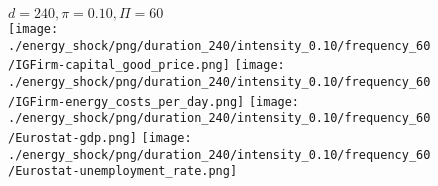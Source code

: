 \begin{figure}[ht!]
\centering\leavevmode
\begin{minipage}{17cm}
\centering\leavevmode
{$d=240, \pi=0.10, \Pi=60$}\\
\texttt{[image: ./energy\_shock/png/duration\_240/intensity\_0.10/frequency\_60/IGFirm-capital\_good\_price.png]}
\texttt{[image: ./energy\_shock/png/duration\_240/intensity\_0.10/frequency\_60/IGFirm-energy\_costs\_per\_day.png]}
\texttt{[image: ./energy\_shock/png/duration\_240/intensity\_0.10/frequency\_60/Eurostat-gdp.png]}
\texttt{[image: ./energy\_shock/png/duration\_240/intensity\_0.10/frequency\_60/Eurostat-unemployment\_rate.png]}
\end{minipage}
\end{figure}

